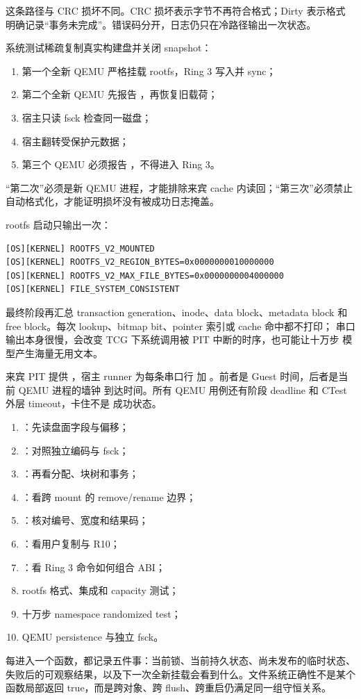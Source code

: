 这条路径与 CRC 损坏不同。CRC 损坏表示字节不再符合格式；Dirty 表示格式
明确记录“事务未完成”。错误码分开，日志仍只在冷路径输出一次状态。

系统测试稀疏复制真实构建盘并关闭 snapshot：

\begin{enumerate}
  \item 第一个全新 QEMU 严格挂载 rootfs，Ring 3 写入并 sync；
  \item 第二个全新 QEMU 先报告 ，再恢复旧载荷；
  \item 宿主只读 fsck 检查同一磁盘；
  \item 宿主翻转受保护元数据；
  \item 第三个 QEMU 必须报告 ，不得进入 Ring 3。
\end{enumerate}

“第二次”必须是新 QEMU 进程，才能排除来宾 cache 内读回；“第三次”必须禁止
自动格式化，才能证明损坏没有被成功日志掩盖。

rootfs 启动只输出一次：

\begin{lstlisting}[caption={rootfs v2 的一次启动日志}]
[OS][KERNEL] ROOTFS_V2_MOUNTED
[OS][KERNEL] ROOTFS_V2_REGION_BYTES=0x0000000010000000
[OS][KERNEL] ROOTFS_V2_MAX_FILE_BYTES=0x0000000004000000
[OS][KERNEL] FILE_SYSTEM_CONSISTENT
\end{lstlisting}

最终阶段再汇总 transaction generation、inode、data block、metadata block
和 free block。每次 lookup、bitmap bit、pointer 索引或 cache 命中都不打印；
串口输出本身很慢，会改变 TCG 下系统调用被 PIT 中断的时序，也可能让十万步
模型产生海量无用文本。

来宾 PIT 提供 ，宿主 runner 为每条串口行
加 \code{[QEMU][T+...ms]}。前者是 Guest 时间，后者是当前 QEMU 进程的墙钟
到达时间。所有 QEMU 用例还有阶段 deadline 和 CTest 外层 timeout，卡住不是
成功状态。

\par
\begin{enumerate}
  \item {}：先读盘面字段与偏移；
  \item {}：对照独立编码与 fsck；
  \item {}：再看分配、块树和事务；
  \item {}：看跨 mount 的 remove/rename 边界；
  \item {}：核对编号、宽度和结果码；
  \item {}：看用户复制与 R10；
  \item {}：看 Ring 3 命令如何组合 ABI；
  \item rootfs 格式、集成和 capacity 测试；
  \item 十万步 namespace randomized test；
  \item QEMU persistence 与独立 fsck。
\end{enumerate}

每进入一个函数，都记录五件事：当前锁、当前持久状态、尚未发布的临时状态、
失败后的可观察结果，以及下一次全新挂载会看到什么。文件系统正确性不是某个
函数局部返回 true，而是跨对象、跨 flush、跨重启仍满足同一组守恒关系。
